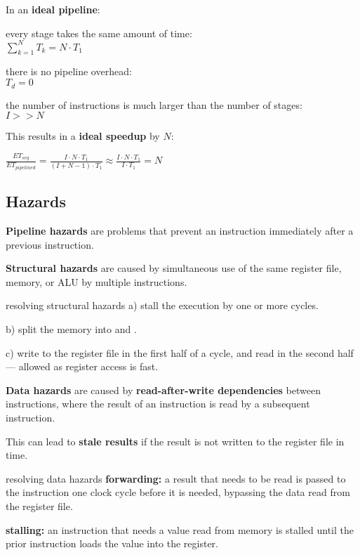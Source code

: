 In an \textbf{ideal pipeline}:
\begin{itemize*}
    \item every stage takes the same amount of time: \\[0.25em] \( \sum_{k=1}^{N} T_k = N \cdot T_1 \)
    \item there is no pipeline overhead: \\[0.25em] \( T_d = 0 \)
    \item the number of instructions is much larger than the number of stages: \\[0.25em] \( I >> N \)
\end{itemize*}

This results in a \textbf{ideal speedup} by $N$:

\( \frac{ET_{seq}}{ET_{pipelined}} = \frac{I \cdot N \cdot T_1}{(I + N - 1) \cdot T_1} \approx \frac{I \cdot N \cdot T_1}{I \cdot T_1} = N \)


\subsection{Hazards}

\textbf{Pipeline hazards} are problems that prevent an instruction immediately
after a previous instruction.

\textbf{Structural hazards} are caused by simultaneous use of the same register file,
memory, or ALU by multiple instructions.

\begin{defn}{resolving structural hazards}
    a) stall the execution by one or more cycles.

    b) split the memory into  and .

    c) write to the register file in the first half of a cycle,
    and read in the second half --- allowed as register access is fast.
\end{defn}

\textbf{Data hazards} are caused by \textbf{read-after-write dependencies} between instructions,
where the result of an instruction is read by a subsequent instruction.

This can lead to \textbf{stale results} if the result is not written to the register file in time.

\begin{defn}{resolving data hazards}
    \textbf{forwarding:} a result that needs to be read is passed to the instruction one clock cycle before it is needed,
    bypassing the data read from the register file.

    \textbf{stalling:} an instruction that needs a value read from memory is stalled until the prior
     instruction loads the value into the register.
\end{defn}

